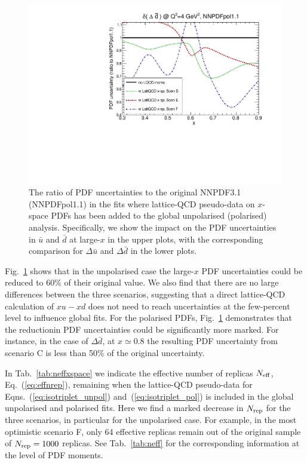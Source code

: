 \begin{figure}[!t]
\includegraphics[scale=0.45]{plots/xdbar-pol-lattice-relerr-xdata-xspace.pdf}
\caption{\small The ratio of PDF uncertainties to the original
  NNPDF3.1 (NNPDFpol1.1) in the fits where lattice-QCD pseudo-data
  on $x$-space PDFs has been added to the global unpolarised
  (polarised) analysis.
  Specifically, we show the impact on the PDF uncertainties
  in $\bar{u}$ and $\bar{d}$ at large-$x$ in the upper
  plots, with the corresponding comparison for $\Delta\bar{u}$
  and $\Delta\bar{d}$ in the lower plots.
}    
\label{fig:impactxspace}
\end{figure}

Fig.~\ref{fig:impactxspace} shows that
in the unpolarised case the large-$x$ PDF uncertainties could be reduced
to $60\%$ of their original value.
%
We also find that there are no large
differences between the three
scenarios, suggesting that a direct lattice-QCD calculation
of $x u-x d$ does not need to reach uncertainties
at the few-percent level to influence global fits.
%
For​ ​the​ ​polarised​ PDFs,​ ​Fig.~\ref{fig:impactxspace} ​demonstrates​ ​that​ ​the
reduction​ ​in​ ​PDF​ ​uncertainties​ ​could​ ​be​ ​significantly​ ​more​ ​marked.
%
For instance, in the case of $\Delta \bar{d}$, at $x\simeq 0.8$
the resulting PDF uncertainty from scenario C is less than 50\%
of the original uncertainty.

In Tab.~\ref{tab:neffxspace} we indicate the effective number of replicas
$N_{\rm eff}$, Eq.~(\ref{eq:effnrep}), remaining when
the lattice-QCD pseudo-data for Eqns.~(\ref{eq:isotriplet_unpol})
and~(\ref{eq:isotriplet_pol}) is included in the global
   unpolarised and polarised fits.
   Here we find a marked decrease in $N_{\rm rep}$
   for the three scenarios,
   in particular for the unpolarised case.
   For example, in the most optimistic scenario F, only
   64 effective replicas remain out of the
   original sample of $N_{\rm rep}=1000$ replicas.
   See Tab.~\ref{tab:neff} for the corresponding
   information at the level of PDF moments.
   
